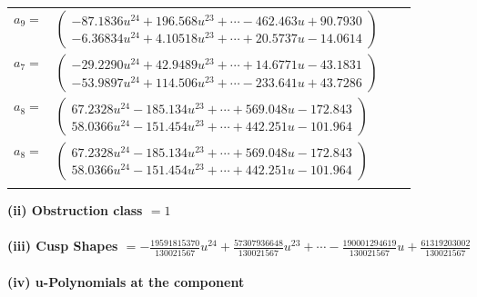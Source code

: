 \documentclass[1p]{elsarticle_modified}
\theoremstyle{definition}
\begin{document}
\begin{tabular}{m{7pt} m{180pt} m{7pt} m{180pt} }
\flushright $a_{9}=$&$\begin{pmatrix}-87.1836 u^{24}+196.568 u^{23}+\cdots-462.463 u+90.7930\\-6.36834 u^{24}+4.10518 u^{23}+\cdots+20.5737 u-14.0614\end{pmatrix}$ \\
\flushright $a_{7}=$&$\begin{pmatrix}-29.2290 u^{24}+42.9489 u^{23}+\cdots+14.6771 u-43.1831\\-53.9897 u^{24}+114.506 u^{23}+\cdots-233.641 u+43.7286\end{pmatrix}$ \\
\flushright $a_{8}=$&$\begin{pmatrix}67.2328 u^{24}-185.134 u^{23}+\cdots+569.048 u-172.843\\58.0366 u^{24}-151.454 u^{23}+\cdots+442.251 u-101.964\end{pmatrix}$\\ \flushright $a_{8}=$&$\begin{pmatrix}67.2328 u^{24}-185.134 u^{23}+\cdots+569.048 u-172.843\\58.0366 u^{24}-151.454 u^{23}+\cdots+442.251 u-101.964\end{pmatrix}$\\&\end{tabular}
\flushleft \textbf{(ii) Obstruction class $= 1$}\\~\\
\flushleft \textbf{(iii) Cusp Shapes $= -\frac{19591815370}{130021567} u^{24}+\frac{57307936648}{130021567} u^{23}+\cdots-\frac{190001294619}{130021567} u+\frac{61319203002}{130021567}$}\\~\\
\newpage\renewcommand{\arraystretch}{1}
\flushleft \textbf{(iv) u-Polynomials at the component}\newline \\
\end{document}
